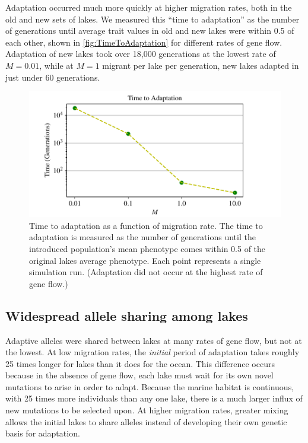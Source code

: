 \documentclass{article}
\begin{document}
Adaptation occurred much more quickly at higher migration rates, both in the old and new sets of lakes. We measured this ``time to adaptation'' as the number of generations until average trait values in old and new lakes were within 0.5 of each other, shown in \autoref{fig:TimeToAdaptation} for different rates of gene flow. Adaptation of new lakes took over 18,000 generations at the lowest rate of $M = 0.01$, while at $M = 1$ migrant per lake per generation, new lakes adapted in just under 60 generations. 

\begin{figure}
    \begin{center}
          \includegraphics{Final_Plots/Time_Adapt2.pdf}
          \caption{
            Time to adaptation as a function of migration rate.
            The time to adaptation is measured as the number of generations until
            the introduced population's mean phenotype 
            comes within 0.5 of the original lakes average phenotype. 
            Each point represents a single simulation run.
            (Adaptation did not occur at the highest rate of gene flow.)
        } \label{fig:TimeToAdaptation}
    \end{center}
\end{figure}

\subsection*{Widespread allele sharing among lakes}

Adaptive alleles were shared between lakes at many rates of gene flow, but not at the lowest.
At low migration rates, the \emph{initial} period of adaptation takes roughly 25 times longer for lakes than it does for the ocean. 
This difference occurs because in the absence of gene flow, each lake must wait for its own novel mutations to arise in order to adapt. 
Because the marine habitat is continuous, with 25 times more individuals than any one lake, there is a much larger influx of new mutations to be selected upon. 
At higher migration rates, greater mixing allows the initial lakes to share alleles instead of developing their own genetic basis for adaptation. 
\end{document}
